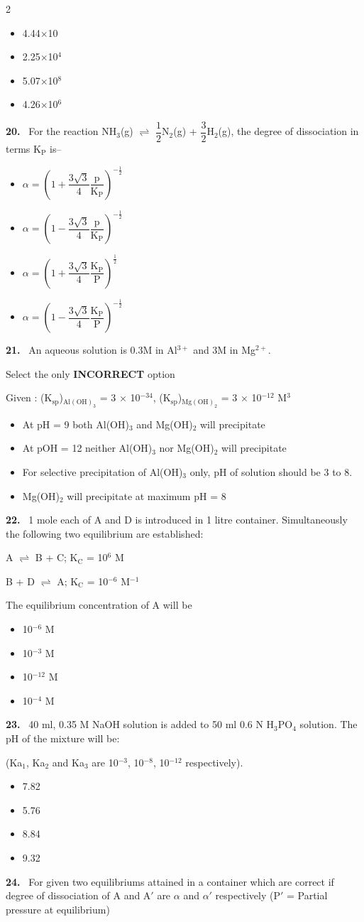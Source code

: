 \documentclass[10pt]{extarticle}
\newcommand{\qn}[1]{\par\smallskip\noindent\textbf{#1.}~}
\newenvironment{qoptions}{\begin{itemize}[leftmargin=1.8em,itemsep=1pt,topsep=2pt,label={}]}{\end{itemize}}
\newcommand{\opt}[2]{\item[(#1)] #2}
\begin{document}
\begin{multicols}{2}
\begin{qoptions}
\opt{A}{4.44$\times$10}
\opt{B}{2.25$\times$10$^4$}
\opt{C}{5.07$\times$10$^8$}
\opt{D}{4.26$\times$10$^6$}
\end{qoptions}
\qn{20} For the reaction NH$_3$(g) $\rightleftharpoons$ $\dfrac12$N$_2$(g) + $\dfrac32$H$_2$(g), the degree of dissociation in terms K$_\mathrm P$ is--
\begin{qoptions}
\opt{A}{$\alpha=\left(1+\dfrac{3\sqrt3}4\dfrac{\mathrm p}{\mathrm K_\mathrm P}\right)^{-\frac12}$}
\opt{B}{$\alpha=\left(1-\dfrac{3\sqrt3}4\dfrac{\mathrm p}{\mathrm K_\mathrm P}\right)^{-\frac12}$}
\opt{C}{$\alpha=\left(1+\dfrac{3\sqrt3}4\dfrac{\mathrm K_\mathrm P}{\mathrm P}\right)^{\frac12}$}
\opt{D}{$\alpha=\left(1-\dfrac{3\sqrt3}4\dfrac{\mathrm K_\mathrm P}{\mathrm P}\right)^{-\frac12}$}
\end{qoptions}
\qn{21} An aqueous solution is 0.3M in Al$^{3+}$ and 3M in Mg$^{2+}$.\par
Select the only \textbf{INCORRECT} option\par
Given : (K$_\mathrm{sp}$)$_{\mathrm{Al(OH)}_3}$ = 3 $\times$ 10$^{-34}$, (K$_\mathrm{sp}$)$_{\mathrm{Mg(OH)}_2}$ = 3 $\times$ 10$^{-12}$ M$^3$
\begin{qoptions}
\opt{A}{At pH = 9 both Al(OH)$_3$ and Mg(OH)$_2$ will precipitate}
\opt{B}{At pOH = 12 neither Al(OH)$_3$ nor Mg(OH)$_2$ will precipitate}
\opt{C}{For selective precipitation of Al(OH)$_3$ only, pH of solution should be 3 to 8.}
\opt{D}{Mg(OH)$_2$ will precipitate at maximum pH = 8}
\end{qoptions}
\qn{22} 1 mole each of A and D is introduced in 1 litre container. Simultaneously the following two equilibrium are established:\par
A $\rightleftharpoons$ B + C; K$_\mathrm C$ = 10$^6$ M\par
B + D $\rightleftharpoons$ A; K$_\mathrm C$ = 10$^{-6}$ M$^{-1}$\par
The equilibrium concentration of A will be
\begin{qoptions}
\opt{A}{10$^{-6}$ M}
\opt{B}{10$^{-3}$ M}
\opt{C}{10$^{-12}$ M}
\opt{D}{10$^{-4}$ M}
\end{qoptions}
\qn{23} 40 ml, 0.35 M NaOH solution is added to 50 ml 0.6 N H$_3$PO$_4$ solution. The pH of the mixture will be:\par
(Ka$_1$, Ka$_2$ and Ka$_3$ are 10$^{-3}$, 10$^{-8}$, 10$^{-12}$ respectively).
\begin{qoptions}
\opt{A}{7.82}
\opt{B}{5.76}
\opt{C}{8.84}
\opt{D}{9.32}
\end{qoptions}
\qn{24} For given two equilibriums attained in a container which are correct if degree of dissociation of A and A$'$ are $\alpha$ and $\alpha'$ respectively (P$'$ = Partial pressure at equilibrium)\par

\end{multicols}
\end{document}
